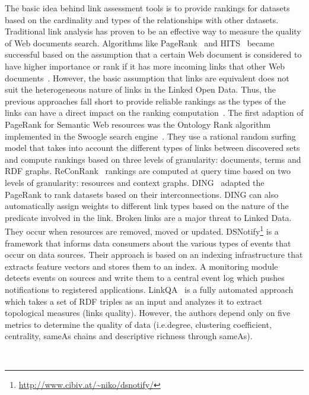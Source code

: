The basic idea behind link assessment tools is to provide rankings for datasets based on the cardinality and types of the relationships with other datasets. Traditional link analysis has proven to be an effective way to measure the quality of Web documents search. Algorithms like PageRank~\cite{Page:TechReport:98} and HITS~\cite{Kleinberg:ACM:99} became successful based on the assumption that a certain Web document is considered to have higher importance or rank if it has more incoming links that other Web documents~\cite{Brin:WWW:98}\cite{Chakrabarti:IEEE:99}. However, the basic assumption that links are equivalent does not suit the heterogeneous nature of links in the Linked Open Data. Thus, the previous approaches fall short to provide reliable rankings as the types of the links can have a direct impact on the ranking computation~\cite{Toupikov:LDOW:09}. The first adaption of PageRank for Semantic Web resources was the Ontology Rank algorithm implemented in the Swoogle search engine~\cite{Ding:CIKM:04}. They use a rational random surfing model that takes into account the different types of links between discovered sets and compute rankings based on three levels of granularity: documents, terms and RDF graphs. ReConRank~\cite{Hogan:SSKB:06} rankings are computed at query time based on two levels of granularity: resources and context graphs. DING~\cite{Toupikov:LDOW:09} adapted the PageRank to rank datasets based on their interconnections. DING can also automatically assign weights to different link types based on the nature of the predicate involved in the link. Broken links are a major threat to Linked Data. They occur when resources are removed, moved or updated. DSNotify\footnote{\url{http://www.cibiv.at/~niko/dsnotify/}}\cite{Haslhofer:IWS:09} is a framework that informs data consumers about the various types of events that occur on data sources. Their approach is based on an indexing infrastructure that extracts feature vectors and stores them to an index. A monitoring module detects events on sources and write them to a central event log which pushes notifications to registered applications. LinkQA~\cite{Gueret:ESWC:12} is a fully automated approach which takes a set of RDF triples as an input and analyzes it to extract topological measures (links quality). However, the authors depend only on five metrics to determine the quality of data (i.e.degree, clustering coefficient, centrality, sameAs chains and descriptive richness through sameAs).

\\

